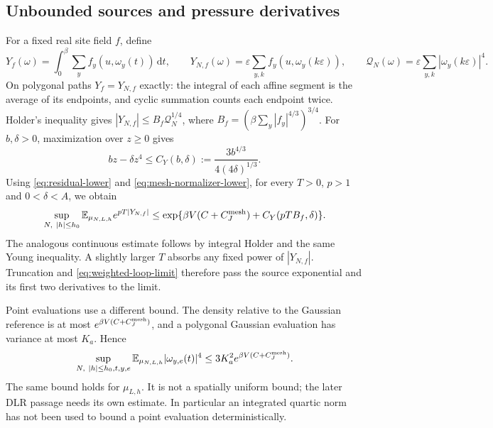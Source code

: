 \documentclass[11pt]{article}
\numberwithin{equation}{section}
\theoremstyle{definition}
\newcommand{\E}{\mathbb E}
\newcommand{\dd}{\,\mathrm d}
\newcommand{\eps}{\varepsilon}
\begin{document}
\subsection{Unbounded sources and pressure derivatives}
\label{sec:source-moments}

For a fixed real site field $f$, define
\[
 Y_f(\omega)=\int_0^\beta\sum_yf_y(u,\omega_y(t))\dd t,\qquad
 Y_{N,f}(\omega)=\eps\sum_{y,k}f_y(u,\omega_y(k\eps)),\qquad
 \mathcal Q_N(\omega)=\eps\sum_{y,k}|\omega_y(k\eps)|^4.
\]
On polygonal paths $Y_f=Y_{N,f}$ exactly: the integral of each affine
segment is the average of its endpoints, and cyclic summation counts each
endpoint twice. Holder's inequality gives
$|Y_{N,f}|\leq B_f\mathcal Q_N^{1/4}$, where
$B_f=(\beta\sum_y|f_y|^{4/3})^{3/4}$.
For $b,\delta>0$, maximization over $z\geq0$ gives
\[
 bz-\delta z^4\leq C_Y(b,\delta)
 :=\frac{3b^{4/3}}{4(4\delta)^{1/3}}.
\]
Using \eqref{eq:residual-lower} and \eqref{eq:mesh-normalizer-lower},
for every $T>0$, $p>1$ and $0<\delta<A$, we obtain
\begin{equation}
 \sup_{N,\ |h|\leq h_0}\E_{\mu_{N,L,h}}e^{pT|Y_{N,f}|}
 \leq\exp\{\beta V(C+C_J^{\rm mesh})+C_Y(pTB_f,\delta)\}.
 \label{eq:mesh-source-ui}
\end{equation}
The analogous continuous estimate follows by integral Holder and the same
Young inequality. A slightly larger $T$ absorbs any fixed power of
$|Y_{N,f}|$. Truncation and \eqref{eq:weighted-loop-limit} therefore pass
the source exponential and its first two derivatives to the limit.

Point evaluations use a different bound. The density relative to the
Gaussian reference is at most $e^{\beta V(C+C_J^{\rm mesh})}$, and a
polygonal Gaussian evaluation has variance at most $K_a$. Hence
\begin{equation}
 \sup_{N,\ |h|\leq h_0,t,y,e}
 \E_{\mu_{N,L,h}}|\omega_{y,e}(t)|^4
 \leq3K_a^2 e^{\beta V(C+C_J^{\rm mesh})}.
 \label{eq:fixed-volume-evaluation-moment}
\end{equation}
The same bound holds for $\mu_{L,h}$. It is not a spatially uniform
bound; the later DLR passage needs its own estimate. In particular an
integrated quartic norm has not been used to bound a point evaluation
deterministically.
\end{document}
